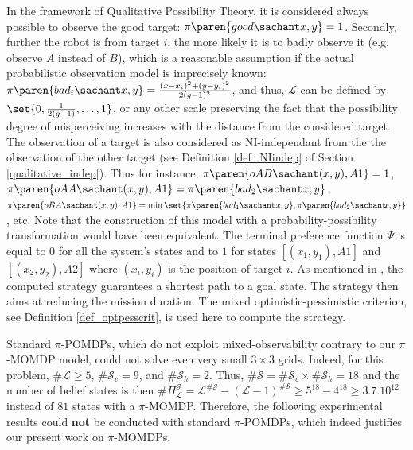 In the framework of Qualitative Possibility Theory, 
it is considered always possible to observe the good target: 
$\pi \paren{good \sachant x,y}=1$. 
Secondly, further the robot is from target $i$, 
the more likely it is to badly observe it 
(e.g. observe $A$ instead of $B$), 
which is a reasonable assumption 
if the actual probabilistic observation model is
imprecisely known: 
$\pi \paren{ bad_i \sachant x,y } 
= \frac{(x-x_i)^2 + (y-y_i)^2 }{2(g-1)^2}$,
and thus, $\mathcal{L}$
can be defined by $\set{ 0, \frac{1}{2(g-1)}, \ldots, 1}$,
or any other scale preserving the fact
that the possibility degree of misperceiving 
increases with the distance from the considered target. 
The observation of a target is also considered 
as NI-independant from the the observation of the other target
(see Definition \ref{def_NIindep} of Section \ref{qualitative_indep}).
Thus for instance, 
$\pi \paren{ oAB \sachant (x,y), A1 }=1$, 
$\pi \paren{ oAA \sachant (x,y), A1 } 
= \pi \paren{ bad_2 \sachant x,y } $, 
$\pi \paren{ oBA \sachant (x,y), A1 } 
= \min \set{ \pi \paren{ bad_1 \sachant x,y },
\pi \paren{ bad_2 \sachant \hspace{-0.1cm} x,y }} $, etc.
Note that the construction of this model 
with a probability-possibility transformation 
\cite{Dubois93onpossibility/probability} 
would have been equivalent. 
The terminal preference function $\Psi$ is equal to $0$ 
for all the system's states
and to $1$ for states 
$[(x_{1},y_{1}),A1]$ and $[(x_{2},y_{2}),A2]$ 
where $(x_{i},y_{i})$ is the position of target $i$. 
As mentioned in \cite{Sabbadin:1999:pipomdp}, 
the computed strategy guarantees a shortest path to a goal state.
The strategy then aims at reducing the mission duration.
The mixed optimistic-pessimistic criterion,
see Definition \ref{def_optpesscrit},
is used here to compute the strategy.


Standard $\pi$-POMDPs, which do not exploit mixed-observability 
contrary to our $\pi$-MOMDP model, 
could not solve even very small $3 \times 3$ grids.
Indeed, for this problem, 
$\# \mathcal{L} \geqslant 5$, 
$\# \mathcal{S}_v = 9 $, 
and $\# \mathcal{S}_h = 2$. 
Thus, $\# \mathcal{S} = \# \mathcal{S}_v \times \# \mathcal{S}_h = 18$ 
and the number of belief states is then 
$\# \Pi^{\mathcal{S}}_{\mathcal{L}} 
= \mathcal{L}^{\# \mathcal{S}} - (\mathcal{L}-1)^{\# \mathcal{S}} 
\geqslant 5^{18} -4^{18} 
\geqslant 3.7.10^{12}$ 
instead of $81$ states with a $\pi$-MOMDP. 
Therefore, 
the following experimental results 
could \textbf{not} be conducted 
with standard $\pi$-POMDPs, 
which indeed justifies 
our present work on $\pi$-MOMDPs.

